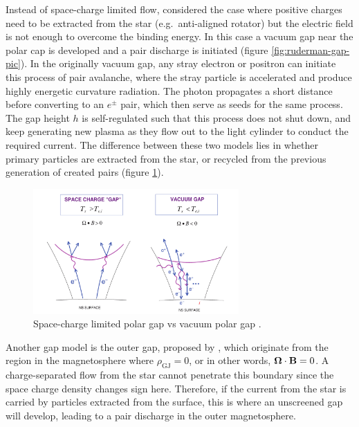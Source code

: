 Instead of space-charge limited flow, \citet{ruderman_theory_1975} considered
the case where positive charges need to be extracted from the star (e.g.\
anti-aligned rotator) but the electric field is not enough to overcome the
binding energy. In this case a vacuum gap near the polar cap is developed and a
pair discharge is initiated (figure \ref{fig:ruderman-gap-pic}). In the
originally vacuum gap, any stray electron or positron can initiate this process
of pair avalanche, where the stray particle is accelerated and produce highly
energetic curvature radiation. The photon propagates a short distance before
converting to an $e^{\pm}$ pair, which then serve as seeds for the same process.
The gap height $h$ is self-regulated such that this process does not shut down,
and keep generating new plasma as they flow out to the light cylinder to conduct
the required current. The difference between these two models lies in whether
primary particles are extracted from the star, or recycled from the previous
generation of created pairs (figure \ref{fig:polar-gaps}).

\begin{figure}[h]
  \centering
  \includegraphics[width=0.7\textwidth]{pics/intro/polar-gaps.png}
  \caption[Space-charge limited polar gap and vacuum polar gap.]{Space-charge
    limited polar gap vs vacuum polar gap \citep{harding_high-energy_2009}.}
  \label{fig:polar-gaps}
\end{figure}

Another gap model is the outer gap, proposed by \citet{cheng_energetic_1986},
which originate from the region in the magnetosphere where $\rho_\mathrm{GJ} =
0$, or in other words, $\bm{\Omega}\cdot \mathbf{B} = 0$. A charge-separated flow from
the star cannot penetrate this boundary since the space charge density changes
sign here. Therefore, if the current from the star is carried by particles
extracted from the surface, this is where an unscreened gap will develop,
leading to a pair discharge in the outer magnetosphere.

